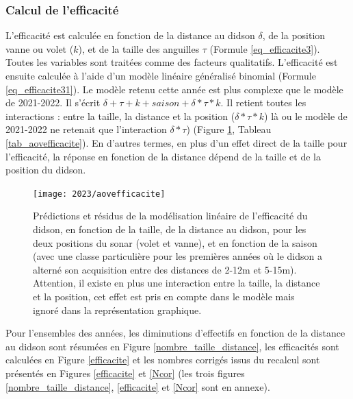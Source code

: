 \documentclass[11pt,twocolumn,titlepage,twoside]{article}
\newlength\defaultparindent
\begin{document}
\subsubsection{Calcul de l'efficacité}\label{par_efficacite}

L'efficacité est calculée en
fonction de la distance au didson $\delta$, de la position vanne ou volet ($k$), 
et de la taille des anguilles $\tau$ (Formule \ref{eq_efficacite3}).
Toutes les variables sont traitées comme des facteurs qualitatifs. L'efficacité
est ensuite calculée à l'aide d'un modèle linéaire généralisé binomial (Formule \ref{eq_efficacite31}).
Le modèle retenu cette année est plus complexe que le modèle de 2021-2022. Il
s'écrit $\delta + \tau + k + saison + \delta*\tau*k$. Il retient toutes les
interactions : entre la taille, la distance et la position ($\delta*\tau*k$) là
ou le modèle de 2021-2022 ne retenait que l'interaction $\delta*\tau$)
(Figure \ref{aovefficacite}, Tableau \ref{tab_aovefficacite}).
En d'autres termes, en plus d'un effet direct de la taille pour l'efficacité, 
la réponse en fonction de la distance dépend de la taille et de la position du
didson.
\begin{figure}[htbp]
  \centering
  \texttt{[image: 2023/aovefficacite]}
  \caption[AOV efficacité]{Prédictions et résidus de la modélisation linéaire
  de l'efficacité du didson, en fonction de la taille, de la distance au
  didson, pour les deux positions du sonar (volet et vanne), et en fonction de
  la saison (avec une classe particulière pour les premières années où le didson
  a alterné son acquisition entre des distances de 2-12m et 5-15m).
  Attention, il existe en plus une interaction entre la taille, la distance et
  la position, cet effet est pris en compte dans le modèle mais ignoré dans la
  représentation graphique.}
  \label{aovefficacite}
\end{figure}
Pour l'ensembles des années, les diminutions d'effectifs en fonction de la
distance au didson sont résumées en Figure \ref{nombre_taille_distance},  
les efficacités sont calculées
en Figure \ref{efficacite} et les nombres corrigés issus du recalcul sont
présentés en Figures \ref{efficacite} et \ref{Ncor}
 (les trois figures \ref{nombre_taille_distance}, \ref{efficacite} et
 \ref{Ncor} sont en annexe).

\noindent       
{}
\end{document}
